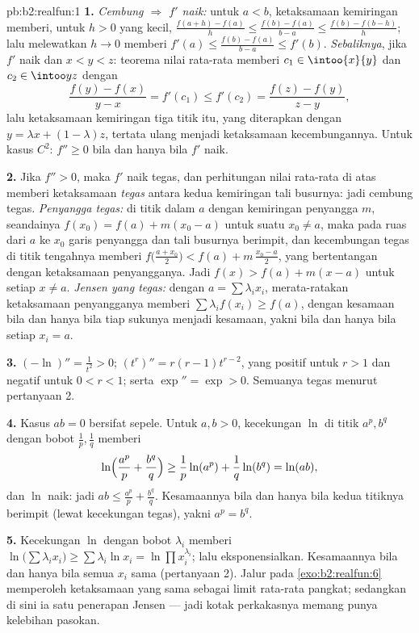 \begin{solution}{pb:b2:realfun:1}
\textbf{1.} \emph{Cembung $\Rightarrow$ $f'$ naik:} untuk $a <
b$, ketaksamaan kemiringan memberi, untuk $h > 0$ yang kecil,
$\frac{f(a+h) - f(a)}h \leq \frac{f(b) - f(a)}{b-a} \leq \frac{f(b) -
f(b-h)}{h}$; lalu melewatkan $h \to 0$ memberi $f'(a) \leq \frac{f(b) -
f(a)}{b - a} \leq f'(b)$. \emph{Sebaliknya}, jika $f'$ naik
dan $x < y < z$: teorema nilai rata-rata memberi $c_1 \in
\intoo{x}{y}$ dan $c_2 \in \intoo yz$ dengan
\[
\frac{f(y) - f(x)}{y - x} = f'(c_1) \leq f'(c_2)
= \frac{f(z) - f(y)}{z - y},
\]
lalu ketaksamaan kemiringan tiga titik itu, yang diterapkan dengan $y =
\lambda x + (1 - \lambda)z$, tertata ulang menjadi ketaksamaan
kecembungannya. Untuk kasus $C^2$: $f'' \geq 0$ bila dan hanya bila $f'$ naik.

\textbf{2.} Jika $f'' > 0$, maka $f'$ naik tegas, dan
perhitungan nilai rata-rata di atas memberi ketaksamaan \emph{tegas}
antara kedua kemiringan tali busurnya: jadi cembung tegas.
\emph{Penyangga tegas:} di titik dalam $a$ dengan kemiringan penyangga
$m$, seandainya $f(x_0) = f(a) + m(x_0 - a)$ untuk suatu $x_0 \neq a$,
maka pada ruas dari $a$ ke $x_0$ garis penyangga dan tali busurnya
berimpit, dan kecembungan tegas di titik tengahnya memberi
$f\bigl(\frac{a + x_0}2\bigr) < f(a) + m\,\frac{x_0 - a}2$, yang
bertentangan dengan ketaksamaan penyangganya. Jadi $f(x) > f(a) + m(x -
a)$ untuk setiap $x \neq a$. \emph{Jensen yang tegas:} dengan $a =
\sum\lambda_ix_i$, merata-ratakan ketaksamaan penyangganya memberi
$\sum\lambda_if(x_i) \geq f(a)$, dengan kesamaan bila dan hanya bila tiap
sukunya menjadi kesamaan, yakni bila dan hanya bila setiap $x_i = a$.

\textbf{3.} $(-\ln)'' = \frac1{t^2} > 0$; $(t^r)'' = r(r -
1)t^{r-2}$, yang positif untuk $r > 1$ dan negatif untuk $0 < r < 1$;
serta $\exp'' = \exp > 0$. Semuanya tegas menurut pertanyaan 2.

\textbf{4.} Kasus $ab = 0$ bersifat sepele. Untuk $a, b > 0$,
kecekungan $\ln$ di titik $a^p, b^q$ dengan bobot
$\frac1p, \frac1q$ memberi
\[
\ln\Bigl(\frac{a^p}p + \frac{b^q}q\Bigr) \geq
\frac1p\ln(a^p) + \frac1q\ln(b^q) = \ln(ab),
\]
dan $\ln$ naik: jadi $ab \leq \frac{a^p}p + \frac{b^q}q$.
Kesamaannya bila dan hanya bila kedua titiknya berimpit (lewat
kecekungan tegas), yakni $a^p = b^q$.

\textbf{5.} Kecekungan $\ln$ dengan bobot $\lambda_i$ memberi
$\ln\bigl(\sum\lambda_ix_i\bigr) \geq \sum\lambda_i\ln x_i =
\ln\prod x_i^{\lambda_i}$; lalu eksponensialkan. Kesamaannya bila dan
hanya bila semua $x_i$ sama (pertanyaan 2). Jalur pada
\cref{exo:b2:realfun:6} memperoleh ketaksamaan yang sama sebagai limit
rata-rata pangkat; sedangkan di sini ia satu penerapan Jensen --- jadi
kotak perkakasnya memang punya kelebihan pasokan.


\end{solution}
